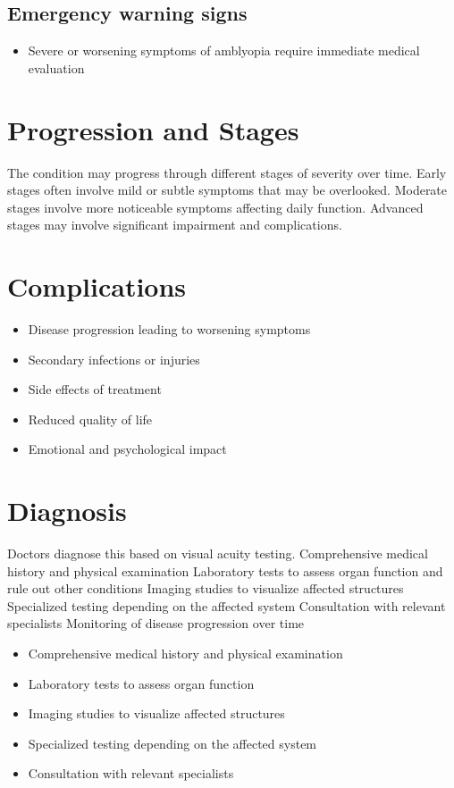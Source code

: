 \subsection{Emergency warning signs}
\begin{itemize}[noitemsep]
  \item Severe or worsening symptoms of amblyopia require immediate medical evaluation
\end{itemize}
\section{Progression and Stages}
The condition may progress through different stages of severity over time. Early stages often involve mild or subtle symptoms that may be overlooked. Moderate stages involve more noticeable symptoms affecting daily function. Advanced stages may involve significant impairment and complications.
\section{Complications}
\begin{itemize}[noitemsep]
  \item Disease progression leading to worsening symptoms
  \item Secondary infections or injuries
  \item Side effects of treatment
  \item Reduced quality of life
  \item Emotional and psychological impact
\end{itemize}
\section{Diagnosis}
Doctors diagnose this based on visual acuity testing. Comprehensive medical history and physical examination Laboratory tests to assess organ function and rule out other conditions Imaging studies to visualize affected structures Specialized testing depending on the affected system Consultation with relevant specialists Monitoring of disease progression over time

\begin{itemize}[noitemsep]
  \item Comprehensive medical history and physical examination
  \item Laboratory tests to assess organ function
  \item Imaging studies to visualize affected structures
  \item Specialized testing depending on the affected system
  \item Consultation with relevant specialists
\end{itemize}
